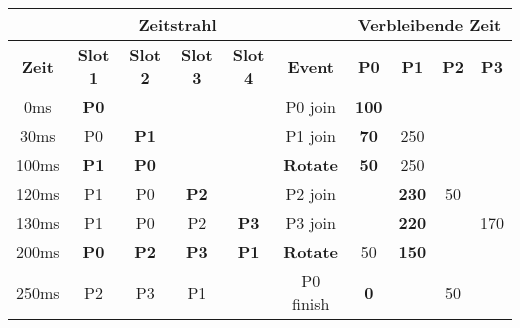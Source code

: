 \documentclass{article}
\begin{document}
\begin{table}[!h]
    \centering
    \begin{tabular}{c|cccc|c|cccc}
        \multicolumn{6}{c}{\textbf{Zeitstrahl}} & \multicolumn{4}{|c}{\textbf{Verbleibende Zeit}}                                                                                                                                   \\ \hline
        \textbf{Zeit}                           & \textbf{Slot 1}                                 & \textbf{Slot 2} & \textbf{Slot 3} & \textbf{Slot 4} & \textbf{Event}  & \textbf{P0}  & \textbf{P1}  & \textbf{P2} & \textbf{P3} \\ \hline
        0ms                                     & \textbf{P0}                                     &                 &                 &                 & P0 join         & \textbf{100} &              &             &             \\
        30ms                                    & P0                                              & \textbf{P1}     &                 &                 & P1 join         & \textbf{70}  & 250          &             &             \\
        100ms                                   & \textbf{P1}                                     & \textbf{P0}     &                 &                 & \textbf{Rotate} & \textbf{50}  & 250          &             &             \\
        120ms                                   & P1                                              & P0              & \textbf{P2}     &                 & P2 join         &              & \textbf{230} & 50          &             \\
        130ms                                   & P1                                              & P0              & P2              & \textbf{P3}     & P3 join         &              & \textbf{220} &             & 170         \\
        200ms                                   & \textbf{P0}                                     & \textbf{P2}     & \textbf{P3}     & \textbf{P1}     & \textbf{Rotate} & 50           & \textbf{150} &             &             \\
        250ms                                   & P2                                              & P3              & P1              &                 & P0 finish       & \textbf{0}   &              & 50          &             \\

\end{tabular}
\end{table}
\end{document}
